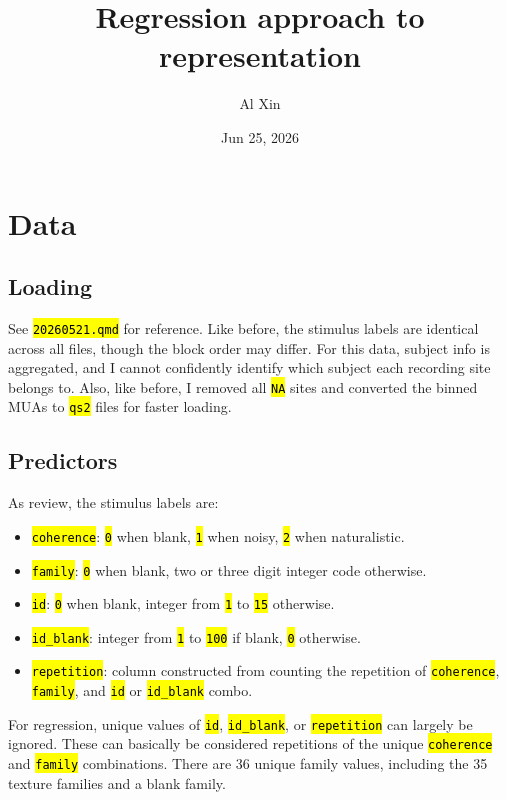 \documentclass[
  10pt,
  letterpaper,
  DIV=11,
  numbers=noendperiod]{scrartcl}
\title{Regression approach to representation}
\author{Al Xin}
\date{Jun 25, 2026}
\providecommand{\tightlist}{%
  \setlength{\itemsep}{0pt}\setlength{\parskip}{0pt}}
\let\OldTexttt\texttt
\renewcommand{\texttt}[1]{\OldTexttt{\hl{#1}}}
\begin{document}
\maketitle


\section{Data}\label{data}

\subsection{Loading}\label{loading}

See \texttt{20260521.qmd} for reference. Like before, the stimulus
labels are identical across all files, though the block order may
differ. For this data, subject info is aggregated, and I cannot
confidently identify which subject each recording site belongs to. Also,
like before, I removed all \texttt{NA} sites and converted the binned
MUAs to \texttt{qs2} files for faster loading.

\subsection{Predictors}\label{predictors}

As review, the stimulus labels are:

\begin{itemize}
\tightlist
\item
  \texttt{coherence}: \texttt{0} when blank, \texttt{1} when noisy,
  \texttt{2} when naturalistic.
\item
  \texttt{family}: \texttt{0} when blank, two or three digit integer
  code otherwise.
\item
  \texttt{id}: \texttt{0} when blank, integer from \texttt{1} to
  \texttt{15} otherwise.
\item
  \texttt{id\_blank}: integer from \texttt{1} to \texttt{100} if blank,
  \texttt{0} otherwise.
\item
  \texttt{repetition}: column constructed from counting the repetition
  of \texttt{coherence}, \texttt{family}, and \texttt{id} or
  \texttt{id\_blank} combo.
\end{itemize}

For regression, unique values of \texttt{id}, \texttt{id\_blank}, or
\texttt{repetition} can largely be ignored. These can basically be
considered repetitions of the unique \texttt{coherence} and
\texttt{family} combinations. There are 36 unique family values,
including the 35 texture families and a blank family.
\end{document}
